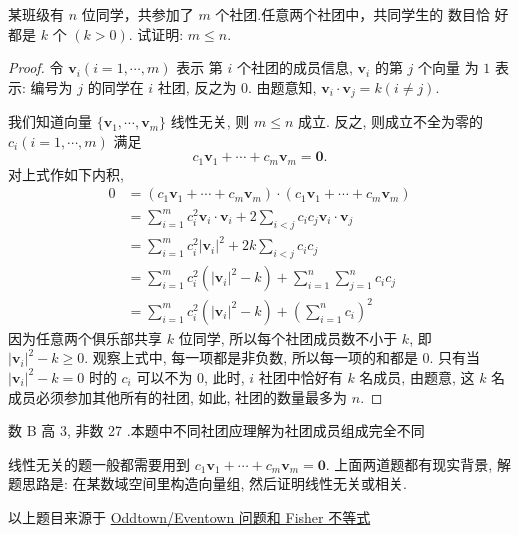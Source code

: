 \documentclass[a4paper, 12pt, UTF8]{ctexart}
\begin{document}
\clearpage
\begin{exa}
    某班级有 $n$ 位同学，共参加了 $m$ 个社团.任意两个社团中，共同学生的
    数目恰 好都是 $k$ 个 $(k>0)$. 试证明: $m \leq n$.
\end{exa} {\color{GoogleRed} \begin{proof}
    令 $\bm{v}_{i}(i = 1, \cdots, m)$ 表示
      第 $i$ 个社团的成员信息, $\bm{v}_{i}$ 的第 $j$ 个向量
      为 $1$ 表示: 编号为 $j$ 的同学在 $i$ 社团, 反之为 $0$. 由题意知, $\bm{v}_{i}\cdot \bm{v}_{j} = k(i\neq j)$.

      我们知道向量 $\{\bm{v}_{1}, \cdots, \bm{v}_{m} \}$ 线性无关, 则 $m \leq n$ 成立. 反之, 则成立不全为零的 $c_{i}(i=1,\cdots,m)$ 满足
      \[
          c_{1}\bm{v}_{1} + \cdots + c_{m}\bm{v}_{m} = \bm{0}.
      \]
      对上式作如下内积,
      \[
          \begin{aligned}
            0 &= (c_{1}\bm{v}_{1} + \cdots + c_{m}\bm{v}_{m}) \cdot (c_{1}\bm{v}_{1} + \cdots + c_{m}\bm{v}_{m}) \\[3pt]
            &= \sum_{i=1}^{m}c_{i}^{2}\bm{v}_{i}\cdot\bm{v}_{i} + 2\sum_{i<j}c_{i}c_{j}\bm{v}_{i}\cdot\bm{v}_{j} \\[3pt]
            &= \sum_{i=1}^{m}c_{i}^{2}|\bm{v}_{i}|^{2} + 2k\sum_{i<j}c_{i}c_{j} \\[3pt]
            &= \sum_{i=1}^{m}c_{i}^{2}(|\bm{v}_{i}|^{2}-k) + \sum_{i=1}^{n}\sum_{j=1}^{n}c_{i}c_{j}\\[3pt]
            &= \sum_{i=1}^{m}c_{i}^{2}(|\bm{v}_{i}|^{2}-k) + \left( \sum_{i=1}^{n} c_{i}\right)^{2}
          \end{aligned}
      \]
      因为任意两个俱乐部共享 $k$ 位同学, 所以每个社团成员数不小于 $k$, 即 $|\bm{v}_{i}|^{2}-k \geq 0$. 观察上式中, 每一项都是非负数, 所以每一项的和都是 $0$. 只有当 $|\bm{v}_{i}|^{2}-k = 0$ 时的 $c_{i}$ 可以不为 $0$, 此时, $i$ 社团中恰好有 $k$ 名成员, 由题意, 这 $k$ 名成员必须参加其他所有的社团, 如此, 社团的数量最多为 $n$.
    
\end{proof}
}

{\color{GoogleGreen} 数 B 高 3, 非数 27 .本题中不同社团应理解为社团成员组成完全不同

}

\vspace{3em}

\begin{thm}{}{}
    {\adkaiti
      线性无关的题一般都需要用到 {\color{GoogleRed}$ c_{1}\bm{v}_{1} + \cdots + c_{m}\bm{v}_{m} = \bm{0}$}. 上面两道题都有现实背景, 解题思路是: 在某数域空间里构造向量组, 然后证明线性无关或相关.

      以上题目来源于 \href{https://math.mit.edu/~lmlovasz/oddtowngood.pdf}{Oddtown/Eventown 问题和 Fisher 不等式}
      }
\end{thm}
\end{document}

